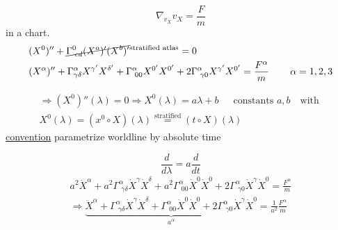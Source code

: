 \[
\nabla_{v_X} v_X = \frac{F}{m}
\]
in a chart.
\[
\begin{aligned}
& (X^0)'' + \cancel{ \Gamma^0_{ \, \, cd } (X^a)' (X^b)' }^{ \text{stratified atlas}} = 0  \\
  & (X^{\alpha})'' + \Gamma^{\alpha}_{\gamma \delta} X^{\gamma'} X^{\delta'} + \Gamma^{\alpha}_{ \, \, 00} X^{0'} X^{0'} + 2\Gamma^{\alpha}_{ \, \, \gamma 0} X^{\gamma'} X^{0'} = \frac{F^{\alpha}}{m} \quad \quad \, \alpha = 1,2,3
\end{aligned}
\]

\[
\begin{gathered}
\Longrightarrow (X^0)''(\lambda) = 0 \Longrightarrow X^0(\lambda) = a\lambda + b \quad \, \text{ constants $a,b$ } \text{ with  }  \\
X^0(\lambda) = (x^0 \circ X)(\lambda) \overset{\text{stratified}}{=} (t\circ X)(\lambda)
\end{gathered}
\]
\underline{convention} parametrize worldline by absolute time

\[
\frac{d}{d\lambda} = a \frac{d}{dt}
\]
\[
\begin{gathered}
a^2 \ddot{X}^{\alpha} + a^2 \Gamma^{\alpha}_{ \, \, \gamma \delta} \dot{X}^{\gamma} \dot{X}^{\delta} + a^2 \Gamma^{\alpha}_{ \, \, 00 } \dot{X}^0 \dot{X}^0 + 2\Gamma^{\alpha}_{ \, \,\gamma 0} \dot{X}^{\gamma} \dot{X}^{0} =  \frac{ F^{\alpha}}{ m} \\
\Longrightarrow  \underbrace{ \ddot{X}^{\alpha} +  \Gamma^{\alpha}_{ \, \, \gamma \delta} \dot{X}^{\gamma} \dot{X}^{\delta} +  \Gamma^{\alpha}_{ \, \, 00 } \dot{X}^0 \dot{X}^0 + 2\Gamma^{\alpha}_{ \, \,\gamma 0} \dot{X}^{\gamma} \dot{X}^{0} }_{a^{\alpha} } = \frac{1}{a^2} \frac{ F^{\alpha}}{ m} 
\end{gathered}
\]
